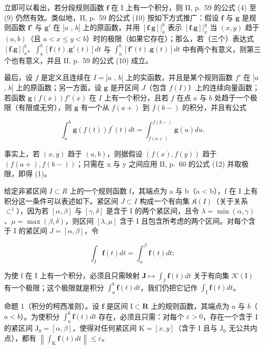 立即可以看出，若分段规则函数 \(\mathbf{f}\) 在 I 上有一个积分，则 II, p.~59 的公式 (4) 至 (9) 仍然有效。类似地，II, p.~59 的公式 (10) 按如下方式推广：假设 \(\mathbf{f}\) 与 \(\mathbf{g}\) 是规则函数 \(\mathbf{f}'\) 与 \(\mathbf{g}'\) 在 \(]a\) , \(b[\) 上的原函数，并用 \([\mathbf{f}.\mathbf{g}]|_a^b\) 表示 \([\mathbf{f}.\mathbf{g}]|_x^y\) 当 \((x, y)\) 趋于 \((a, b)\)（且 \(a < x \leqslant y < b\)）时的极限（如果它存在）；那么，若（三个）表达式 \([\mathbf{f}.\mathbf{g}]|_a^b\)、\(\int_a^b [\mathbf{f}(t).\mathbf{g}'(t)] dt\) 与 \(\int_a^b [\mathbf{f}'(t).\mathbf{g}(t)] dt\) 中有两个有意义，则第三个也有意义，并且 II, p.~59 的公式 (10) 成立。

最后，设 \(f\) 是定义且连续在 \(I = ]a\) , \(b[\) 上的实函数，并且是某个规则函数 \(f'\) 在 \(]a\) , \(b[\) 上的原函数；另一方面，设 \(\mathbf{g}\) 是开区间 \(J\)（包含 \(f(I)\)）上的连续向量函数；若函数 \(\mathbf{g}(f(x))f'(x)\) 在 \(I\) 上有一个积分，且若 \(f\) 在点 \(a\) 与 \(b\) 处趋于一个极限（有限或无穷），则 \(\mathbf{g}\) 有一个从 \(f(a+)\) 到 \(f(b-)\) 的积分，并且有公式

\[
\int_ {a} ^ {b} \mathbf {g} (f (t)) f ^ {\prime} (t) d t = \int_ {f (a +)} ^ {f (b -)} \mathbf {g} (u) d u.\tag{1}
\]

事实上，若 \((x, y)\) 趋于 \((a, b)\)，则据假设 \((f(x), f(y))\) 趋于 \((f(a+), f(b-))\)；只需在 x 与 y 之间应用 II, p.~60 的公式 (12) 并取极限，即得 (1)。

给定非紧区间 \(I \subset R\) 上的一个规则函数 f，其端点为 a 与 b（a \textless{} b），f 在 I 上有积分这一条件可以表述如下。紧区间 \(J \subset I\) 构成一个有向集 \(\mathfrak{K}(I)\)（关于关系 \(\subset^{1}\)），因为若 \([\alpha, \beta]\) 与 \([\gamma, \delta]\) 是含于 I 的两个紧区间，且令 \(\lambda = \min(\alpha, \gamma)\)、\(\mu = \max(\beta, \delta)\)，则区间 \([\lambda, \mu]\) 含于 I 且包含所考虑的两个区间。对每个含于 I 的紧区间 \(J = [\alpha, \beta]\)，令

\[
\int_ {\mathrm{J}} \mathbf {f} (t) d t = \int_ {\alpha} ^ {\beta} \mathbf {f} (t) d t;
\]

为使 f 在 I 上有一个积分，必须且只需映射 \(\mathbf{J} \mapsto \int_{\mathrm{J}} \mathbf{f}(t) dt\) 关于有向集 \(\mathcal{K}(\mathrm{I})\) 有一个极限；这个极限就是积分 \(\int_{a}^{b} \mathbf{f}(t) dt\)，我们仍把它记作 \(\int_{\mathrm{I}} \mathbf{f}(t) dt\)。

命题 1（积分的柯西准则）。设 \(\mathbf{f}\) 是区间 \(\mathrm{I} \subset \mathbf{R}\) 上的规则函数，其端点为 \(a\) 与 \(b\)（\(a < b\)）。为使积分 \(\int_{a}^{b} \mathbf{f}(t) dt\) 存在，必须且只需：对每个 \(\varepsilon > 0\)，存在一个含于 I 的紧区间 \(\mathrm{J}_0 = [\alpha, \beta]\)，使得对任何紧区间 \(\mathrm{K} = [x, y]\)（含于 I 且与 \(\mathrm{J}_0\) 无公共内点），都有 \(\left\| \int_{\mathrm{K}} \mathbf{f}(t) dt \right\| \leqslant \varepsilon\)。


